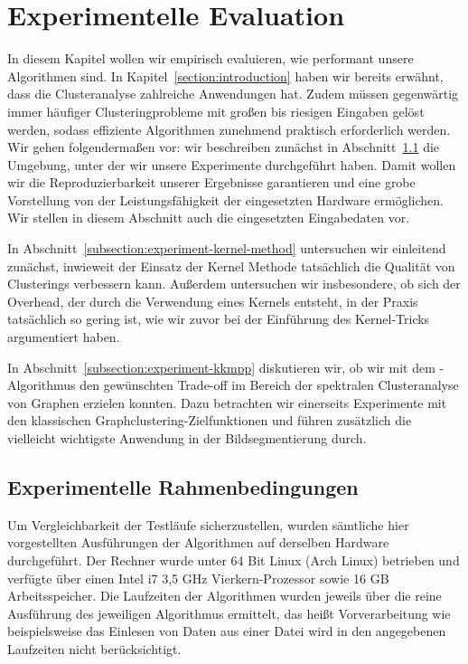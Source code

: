 \section{Experimentelle Evaluation}
\label{section:experiments}

In diesem Kapitel wollen wir empirisch evaluieren, wie performant unsere Algorithmen sind. In Kapitel~\ref{section:introduction}
haben wir bereits erwähnt, dass die Clusteranalyse zahlreiche Anwendungen hat. Zudem müssen gegenwärtig immer häufiger
Clusteringprobleme mit großen bis riesigen Eingaben gelöst werden, sodass effiziente Algorithmen zunehmend praktisch erforderlich
werden.
\absatz
Wir gehen folgendermaßen vor: wir beschreiben zunächst in Abschnitt~\ref{subsection:experiment-environment} die Umgebung, unter
der wir unsere Experimente durchgeführt haben. Damit wollen wir die Reproduzierbarkeit unserer Ergebnisse garantieren und eine
grobe Vorstellung von der Leistungsfähigkeit der eingesetzten Hardware ermöglichen. Wir stellen in diesem Abschnitt auch 
die eingesetzten Eingabedaten vor.

In Abschnitt~\ref{subsection:experiment-kernel-method} untersuchen wir einleitend zunächst, inwieweit der Einsatz der Kernel
Methode tatsächlich die Qualität von Clusterings verbessern kann. Außerdem untersuchen wir insbesondere, ob sich der Overhead,
der durch die Verwendung eines Kernels entsteht, in der Praxis tatsächlich so gering ist, wie wir zuvor bei der Einführung des
Kernel-Tricks argumentiert haben.

In Abschnitt~\ref{subsection:experiment-kkmpp} diskutieren wir, ob wir mit dem \kkmpp-Algorithmus den gewünschten Trade-off im
Bereich der spektralen Clusteranalyse von Graphen erzielen konnten. Dazu betrachten wir einerseits Experimente mit den klassischen
Graphclustering-Zielfunktionen und führen zusätzlich die vielleicht wichtigste Anwendung in der Bildsegmentierung durch.

\subsection{Experimentelle Rahmenbedingungen}
\label{subsection:experiment-environment}

Um Vergleichbarkeit der Testläufe sicherzustellen, wurden sämtliche hier vorgestellten Ausführungen der Algorithmen auf derselben
Hardware durchgeführt. Der Rechner wurde unter 64 Bit Linux (Arch Linux) betrieben und verfügte über einen
Intel i7 3,5 GHz Vierkern-Prozessor sowie 16 GB Arbeitsspeicher. Die Laufzeiten der Algorithmen wurden jeweils über die reine
Ausführung des jeweiligen Algorithmus ermittelt, das heißt Vorverarbeitung wie beispielsweise das Einlesen von Daten aus einer
Datei wird in den angegebenen Laufzeiten nicht berücksichtigt.

